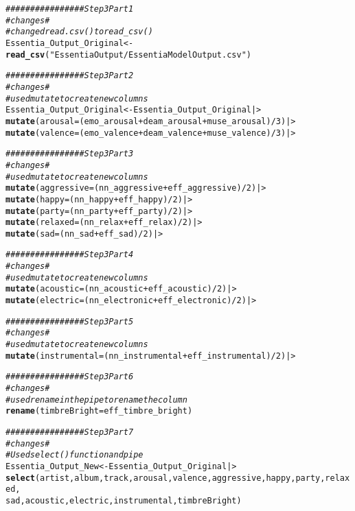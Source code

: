 \documentclass{article}\usepackage[]{graphicx}\usepackage[]{xcolor}
\makeatletter
\newcommand{\hlnum}[1]{\textcolor[rgb]{0.686,0.059,0.569}{#1}}%
\newcommand{\hlsng}[1]{\textcolor[rgb]{0.192,0.494,0.8}{#1}}%
\newcommand{\hlcom}[1]{\textcolor[rgb]{0.678,0.584,0.686}{\textit{#1}}}%
\newcommand{\hlopt}[1]{\textcolor[rgb]{0,0,0}{#1}}%
\newcommand{\hldef}[1]{\textcolor[rgb]{0.345,0.345,0.345}{#1}}%
\newcommand{\hlkwb}[1]{\textcolor[rgb]{0.69,0.353,0.396}{#1}}%
\newcommand{\hlkwc}[1]{\textcolor[rgb]{0.333,0.667,0.333}{#1}}%
\newcommand{\hlkwd}[1]{\textcolor[rgb]{0.737,0.353,0.396}{\textbf{#1}}}%
\newenvironment{kframe}{%
 \def\at@end@of@kframe{}%
 \ifinner\ifhmode%
  \def\at@end@of@kframe{\end{minipage}}%
  \begin{minipage}{\columnwidth}%
 \fi\fi%
 \def\FrameCommand##1{\hskip\@totalleftmargin \hskip-\fboxsep
 \colorbox{shadecolor}{##1}\hskip-\fboxsep
     \hskip-\linewidth \hskip-\@totalleftmargin \hskip\columnwidth}%
 \MakeFramed {\advance\hsize-\width
   \@totalleftmargin\z@ \linewidth\hsize
   \@setminipage}}%
 {\par\unskip\endMakeFramed%
 \at@end@of@kframe}
\newenvironment{knitrout}{}{} %
\makeatother
\begin{document}
\begin{enumerate}
\begin{knitrout}
\begin{kframe}
\begin{alltt}
\hlcom{################ Step 3 Part 1}
\hlcom{#changes#}
\hlcom{#changed read.csv() to read_csv()}
\hldef{Essentia_Output_Original} \hlkwb{<-} \hlkwd{read_csv}\hldef{(}\hlsng{"EssentiaOutput/EssentiaModelOutput.csv"}\hldef{)}

\hlcom{################ Step 3 Part 2}
\hlcom{#changes#}
\hlcom{#used mutate to create new columns}
\hldef{Essentia_Output_Original} \hlkwb{<-} \hldef{Essentia_Output_Original |>}
  \hlkwd{mutate}\hldef{(}\hlkwc{arousal} \hldef{= (emo_arousal} \hlopt{+} \hldef{deam_arousal} \hlopt{+} \hldef{muse_arousal)} \hlopt{/} \hlnum{3}\hldef{) |>}
  \hlkwd{mutate}\hldef{(}\hlkwc{valence} \hldef{= (emo_valence}  \hlopt{+} \hldef{deam_valence} \hlopt{+} \hldef{muse_valence)}\hlopt{/} \hlnum{3}\hldef{) |>}

\hlcom{################ Step 3 Part 3}
\hlcom{#changes#}
\hlcom{#used mutate to create new columns}
  \hlkwd{mutate}\hldef{(}\hlkwc{aggressive} \hldef{= (nn_aggressive}  \hlopt{+} \hldef{eff_aggressive)}\hlopt{/} \hlnum{2}\hldef{) |>}
  \hlkwd{mutate}\hldef{(}\hlkwc{happy} \hldef{= (nn_happy}  \hlopt{+} \hldef{eff_happy)}\hlopt{/} \hlnum{2}\hldef{) |>}
  \hlkwd{mutate}\hldef{(}\hlkwc{party} \hldef{= (nn_party}  \hlopt{+} \hldef{eff_party)}\hlopt{/} \hlnum{2}\hldef{) |>}
  \hlkwd{mutate}\hldef{(}\hlkwc{relaxed} \hldef{= (nn_relax}  \hlopt{+} \hldef{eff_relax)}\hlopt{/} \hlnum{2}\hldef{) |>}
  \hlkwd{mutate}\hldef{(}\hlkwc{sad} \hldef{= (nn_sad}  \hlopt{+} \hldef{eff_sad)}\hlopt{/} \hlnum{2}\hldef{) |>}

\hlcom{################ Step 3 Part 4}
\hlcom{#changes#}
\hlcom{#used mutate to create new columns}
  \hlkwd{mutate}\hldef{(}\hlkwc{acoustic} \hldef{=(nn_acoustic} \hlopt{+} \hldef{eff_acoustic)}\hlopt{/} \hlnum{2}\hldef{) |>}
  \hlkwd{mutate}\hldef{(}\hlkwc{electric} \hldef{=(nn_electronic} \hlopt{+} \hldef{eff_electronic)}\hlopt{/} \hlnum{2}\hldef{) |>}

\hlcom{################ Step 3 Part 5}
\hlcom{#changes#}
\hlcom{#used mutate to create new columns}
  \hlkwd{mutate}\hldef{(}\hlkwc{instrumental} \hldef{=(nn_instrumental} \hlopt{+} \hldef{eff_instrumental)}\hlopt{/} \hlnum{2}\hldef{) |>}

\hlcom{################ Step 3 Part 6}
\hlcom{#changes#}
\hlcom{#used rename in the pipe to rename the column}
  \hlkwd{rename}\hldef{(}\hlkwc{timbreBright} \hldef{= eff_timbre_bright )}

\hlcom{################ Step 3 Part 7}
\hlcom{#changes#}
\hlcom{#Used select() function and pipe}
\hldef{Essentia_Output_New} \hlkwb{<-} \hldef{Essentia_Output_Original |>}
  \hlkwd{select}\hldef{(artist, album, track, arousal, valence, aggressive, happy, party, relaxed,}
         \hldef{sad, acoustic, electric, instrumental, timbreBright)}



\end{alltt}
\end{kframe}
\end{knitrout}
\end{enumerate}
\end{document}
